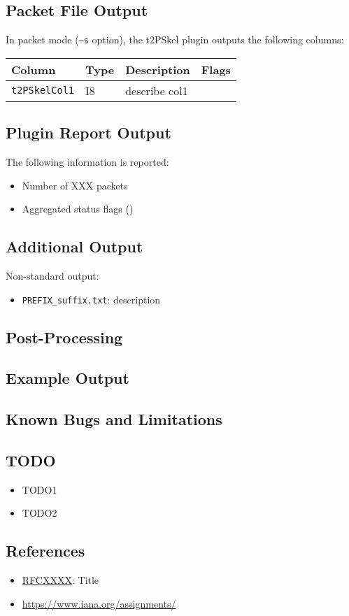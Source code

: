 \documentclass[documentation]{subfiles}
\begin{document}
\subsection{Packet File Output}
In packet mode ({\tt --s} option), the t2PSkel plugin outputs the following columns:
\begin{longtable}{llll}
    \toprule
    {\bf Column} & {\bf Type} & {\bf Description} & {\bf Flags}\\
    \midrule\endhead%
    {\tt t2PSkelCol1} & I8 & describe col1 & \\
    \bottomrule
\end{longtable}

\subsection{Plugin Report Output}
The following information is reported:
\begin{itemize}
    \item Number of XXX packets
    \item Aggregated status flags ({\tt{}})
\end{itemize}

\subsection{Additional Output}
Non-standard output:
\begin{itemize}
    \item {\tt PREFIX\_suffix.txt}: description
\end{itemize}

\subsection{Post-Processing}

\subsection{Example Output}

\subsection{Known Bugs and Limitations}

\subsection{TODO}
\begin{itemize}
    \item TODO1
    \item TODO2
\end{itemize}

\subsection{References}
\begin{itemize}
    \item \href{https://tools.ietf.org/html/rfcXXXX}{RFCXXXX}: Title
    \item \url{https://www.iana.org/assignments/}
\end{itemize}
\end{document}
